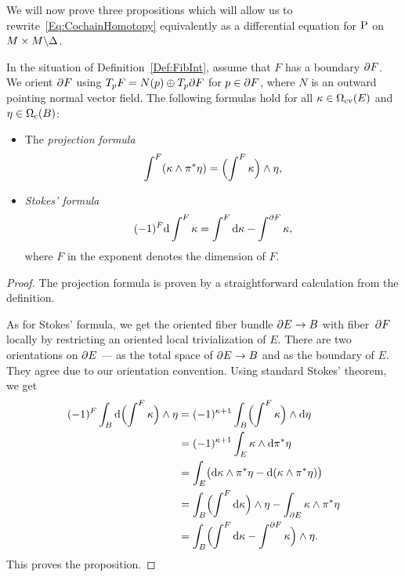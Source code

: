 \documentclass[\MainFolder/Text.tex]{subfiles}
\begin{document}
We will now prove three propositions which will allow us to rewrite~\eqref{Eq:CochainHomotopy} equivalently as a differential equation for $\mathrm{P}$ on $M\times M \backslash \Delta$.


\begin{Proposition}\label{Prop:StokesForm}
In the situation of Definition~\ref{Def:FibInt},
assume that $F$ has a boundary $\partial F$.
We orient $\partial F$ using $T_p F = N(p)\oplus T_p \partial F$ for $p\in \partial F$, where $N$ is an outward pointing normal vector field.
The following formulas hold for all $\kappa\in \Omega_{\mathrm{cv}}(E)$ and $\eta\in \Omega_{\mathrm{c}}(B)$:
\begin{itemize}
\item The \emph{projection formula}
\[\int^{F}(\kappa\wedge \pi^* \eta) = \Bigl(\int^{F}\kappa\Bigr)\wedge \eta, \]
\item \emph{Stokes' formula}
\[(-1)^F \mathrm{d} \int^{F}\kappa  = \int^{F} \mathrm{d} \kappa -  \int^{\partial F} \kappa, \]
where $F$ in the exponent denotes the dimension of $F$.
\end{itemize}
\end{Proposition} 
%
\begin{proof} %
The projection formula is proven by a straightforward calculation from the definition.

As for Stokes' formula, we get the oriented fiber bundle $\partial E \rightarrow B$ with fiber~$\partial F$ locally by restricting an oriented local trivialization of $E$.
There are two orientations on $\partial E$ --- as the total space of $\partial E \rightarrow B$ and as the boundary of $E$.
They agree due to our orientation convention.
Using standard Stokes' theorem, we get
\allowdisplaybreaks
\begin{align*}
 (-1)^F \int_B \mathrm{d} \Bigl(\int^{F}\kappa\Bigr) \wedge \eta & = (-1)^{\kappa + 1} \int_B \Bigl(\int^{F}\kappa\Bigr)\wedge \mathrm{d} \eta \\ &=  (-1)^{\kappa + 1} \int_{E} \kappa \wedge \mathrm{d} \pi^*\eta \\
  & = \int_E \bigl(\mathrm{d} \kappa \wedge \pi^*\eta - \mathrm{d}(\kappa \wedge\pi^*\eta)\bigr) \\ 
  &= \int_B \Bigl(\int^{F} \mathrm{d} \kappa\Bigr) \wedge \eta - \int_{\partial E} \kappa \wedge \pi^*\eta \\ 
  &= \int_B \Bigl(\int^{F} \mathrm{d} \kappa - \int^{\partial F}\kappa \Bigr) \wedge \eta.
\end{align*}
This proves the proposition.
\end{proof}
\end{document}

